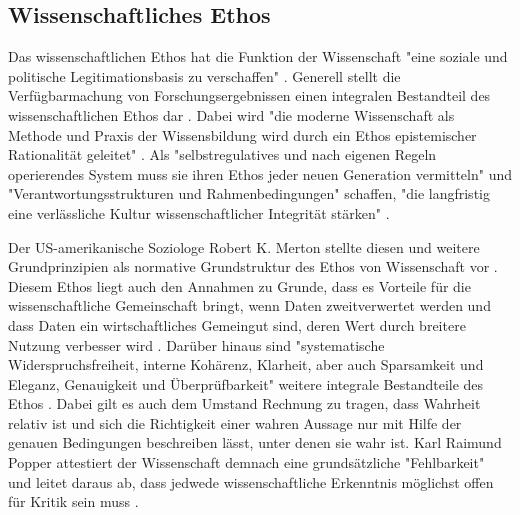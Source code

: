 \subsection{Wissenschaftliches Ethos}

Das wissenschaftlichen Ethos hat die Funktion der Wissenschaft "eine soziale und politische Legitimationsbasis zu verschaffen" \cite{descher_2012_ethos}. Generell stellt die Verfügbarmachung von Forschungsergebnissen einen integralen Bestandteil des wissenschaftlichen Ethos dar \cite{Fangerau_2014}. Dabei wird "die moderne Wissenschaft als Methode und Praxis der Wissensbildung wird durch ein Ethos epistemischer Rationalität geleitet" \cite{Oezmen_2015}. Als "selbstregulatives und nach eigenen Regeln operierendes System muss sie ihren Ethos jeder neuen Generation vermitteln" und "Verantwortungsstrukturen und Rahmenbedingungen" schaffen, "die langfristig eine verlässliche Kultur wissenschaftlicher Integrität stärken" \cite[:7]{wr_2015_wissenschaft_integritaet}.

Der US-amerikanische Soziologe Robert K. Merton stellte diesen und weitere Grundprinzipien als normative Grundstruktur des Ethos von Wissenschaft vor \cite{Merton_1985}. Diesem Ethos liegt auch den Annahmen zu Grunde, dass es Vorteile für die wissenschaftliche Gemeinschaft bringt, wenn Daten zweitverwertet werden und dass Daten ein wirtschaftliches Gemeingut sind, deren Wert durch breitere Nutzung verbesser wird \cite{RIN_2010_open_research}. Darüber hinaus sind "systematische Widerspruchsfreiheit, interne Kohärenz, Klarheit, aber auch Sparsamkeit und Eleganz, Genauigkeit und Überprüfbarkeit" weitere integrale Bestandteile des Ethos \cite{Oezmen_2015}. Dabei gilt es auch dem Umstand Rechnung zu tragen, dass Wahrheit relativ ist und sich die Richtigkeit einer wahren Aussage nur mit Hilfe der genauen Bedingungen beschreiben lässt, unter denen sie wahr ist. Karl Raimund Popper attestiert der Wissenschaft demnach eine grundsätzliche "Fehlbarkeit" und leitet daraus ab, dass jedwede wissenschaftliche Erkenntnis möglichst offen für Kritik sein muss \cite{popper_2005_logic}.

